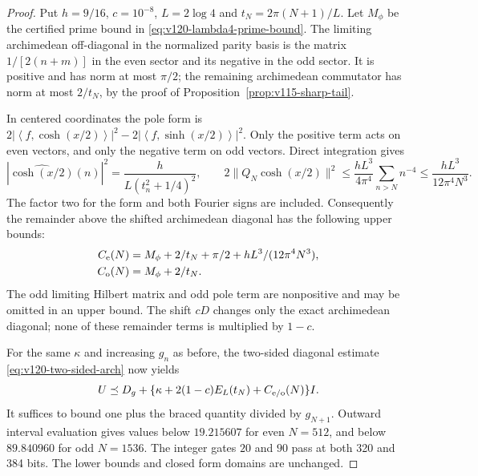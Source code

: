 \documentclass[11pt]{article}
\theoremstyle{remark}
\newcommand{\ip}[2]{\left\langle #1,#2\right\rangle}
\begin{document}
\begin{proof}
Put $h=9/16$, $c=10^{-8}$, $L=2\log4$ and
$t_N=2\pi(N+1)/L$. Let $M_\phi$ be the certified prime bound
in \eqref{eq:v120-lambda4-prime-bound}. The limiting archimedean
off-diagonal in the normalized parity basis is the matrix
$1/[2(n+m)]$ in the even sector and its negative in the odd sector.
It is positive and has norm at most $\pi/2$; the remaining
archimedean commutator has norm at most $2/t_N$, by the proof of
Proposition~\ref{prop:v115-sharp-tail}.

In centered coordinates the pole form is
$2|\ip f{\cosh(x/2)}|^2-2|\ip f{\sinh(x/2)}|^2$.
Only the positive term acts on even vectors, and only the negative
term on odd vectors. Direct integration gives
\[
 |\widehat{\cosh(x/2)}(n)|^2
 =\frac{h}{L(t_n^2+1/4)^2},\qquad
 2\|Q_N\cosh(x/2)\|^2
 \le\frac{hL^3}{4\pi^4}\sum_{n>N}n^{-4}
 \le\frac{hL^3}{12\pi^4N^3}.
\]
The factor two for the form and both Fourier signs are included.
Consequently the remainder above the shifted archimedean diagonal
has the following upper bounds:
\begin{equation}\label{eq:v122-parity-upper}
 \begin{split}
 C_{\rm e}(N)&=M_\phi+2/t_N+\pi/2+hL^3/(12\pi^4N^3),\\
 C_{\rm o}(N)&=M_\phi+2/t_N.
 \end{split}
\end{equation}
The odd limiting Hilbert matrix and odd pole term are nonpositive
and may be omitted in an upper bound. The shift $cD$ changes only
the exact archimedean diagonal; none of these remainder terms is
multiplied by $1-c$.

For the same $\kappa$ and increasing $g_n$ as before, the two-sided
diagonal estimate \eqref{eq:v120-two-sided-arch} now yields
\[
 U\preceq D_g+
 \{\kappa+2(1-c)E_L(t_N)+C_{\rm e/o}(N)\}I.
\]
It suffices to bound one plus the braced quantity divided by
$g_{N+1}$. Outward interval evaluation gives values below
$19.215607$ for even $N=512$, and below $89.840960$ for odd
$N=1536$. The integer gates $20$ and $90$ pass at both 320 and
384 bits. The lower bounds and closed form domains are unchanged.
\end{proof}
\end{document}
